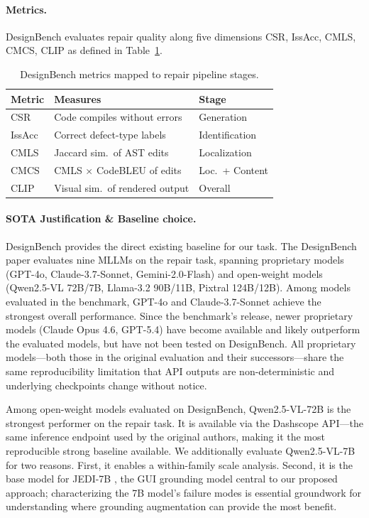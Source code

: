 \documentclass[11pt]{article}
\begin{document}
\paragraph{Metrics.} DesignBench evaluates repair quality along five dimensions CSR, IssAcc, CMLS, CMCS, CLIP as defined in Table~\ref{tab:metrics}.
 
\begin{table}[t]
\centering
\small
\begin{tabular}{lll}
\toprule
\textbf{Metric} & \textbf{Measures} & \textbf{Stage} \\
\midrule
CSR     & Code compiles without errors       & Generation \\
IssAcc  & Correct defect-type labels         & Identification \\
CMLS    & Jaccard sim.\ of AST edits         & Localization \\
CMCS    & CMLS $\times$ CodeBLEU of edits    & Loc.\ + Content \\
CLIP    & Visual sim.\ of rendered output    & Overall \\
\bottomrule
\end{tabular}
\caption{DesignBench metrics mapped to repair pipeline stages.}
\label{tab:metrics}
\end{table}


\paragraph{SOTA Justification \& Baseline choice.}
DesignBench provides the direct existing baseline for our task. The DesignBench paper evaluates nine MLLMs on the repair task, spanning proprietary models (GPT-4o, Claude-3.7-Sonnet, Gemini-2.0-Flash) and open-weight models (Qwen2.5-VL 72B/7B, Llama-3.2 90B/11B, Pixtral 124B/12B). Among models evaluated in the benchmark, GPT-4o and
Claude-3.7-Sonnet achieve the strongest overall performance. Since the benchmark's release, newer proprietary models (Claude Opus 4.6, GPT-5.4) have become available and likely outperform the evaluated models, but have not been tested on DesignBench. All proprietary models---both those in the original evaluation and their successors---share the same reproducibility limitation that API outputs are non-deterministic and underlying checkpoints change without notice.

Among open-weight models evaluated on DesignBench, Qwen2.5-VL-72B is the strongest performer on the repair task. It is available via the Dashscope API---the same inference endpoint used by the original authors, making it the most reproducible strong baseline available. We additionally evaluate Qwen2.5-VL-7B for two reasons. First, it enables a within-family scale analysis. Second, it is the base model for JEDI-7B
\cite{xie2025jedi}, the GUI grounding model central to our proposed approach; characterizing the 7B model's failure modes is essential
groundwork for understanding where grounding augmentation can provide the most benefit.
\end{document}
